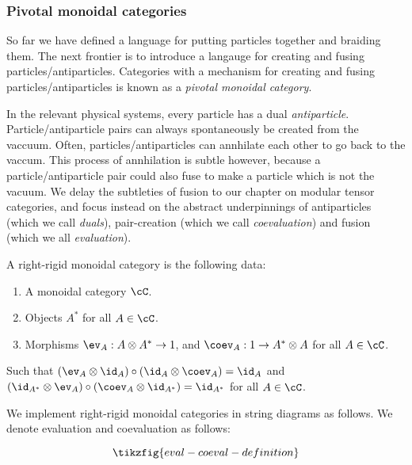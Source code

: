 \subsubsection{Pivotal monoidal categories}

So far we have defined a language for putting particles together and braiding them. The next frontier is to introduce a langauge for creating and fusing particles/antiparticles. Categories with a mechanism for creating and fusing particles/antiparticles is known as a {\em pivotal monoidal category}.

\begin{rem}
In the relevant physical systems, every particle has a dual {\em antiparticle}. Particle/antiparticle pairs can always spontaneously be created from the vaccuum. Often, particles/antiparticles can annhilate each other to go back to the vaccum. This process of annhilation is subtle however, because a particle/antiparticle pair could also fuse to make a particle which is not the vacuum. We delay the subtleties of fusion to our chapter on modular tensor categories, and focus instead on the abstract underpinnings of antiparticles (which we call {\em duals}), pair-creation (which we call {\em coevaluation}) and fusion (which we all {\em evaluation}).
\end{rem}

\begin{defn} A right-rigid monoidal category is the following data:

\begin{enumerate}
\item A monoidal category $\cC$.
\item Objects $A^*$ for all $A\in \cC$.
\item Morphisms $\ev_{A}: A\otimes A^*\to 1$, and $\coev_{A}: 1\to A^*\otimes A$ for all $A\in \cC$.
\end{enumerate}

Such that $(\ev_A \otimes \id_A)\circ (\id_A\otimes \coev_A)=\id_A$ and $(\id_{A^*}\otimes \ev_A)\circ (\coev_{A}\otimes \id_{A^*})=\id_{A^*}$ for all $A\in \cC$. 


\end{defn}

We implement right-rigid monoidal categories in string diagrams as follows. We denote evaluation and coevaluation as follows:

\begin{equation*}
\tikzfig{eval-coeval-definition}
\end{equation*}

